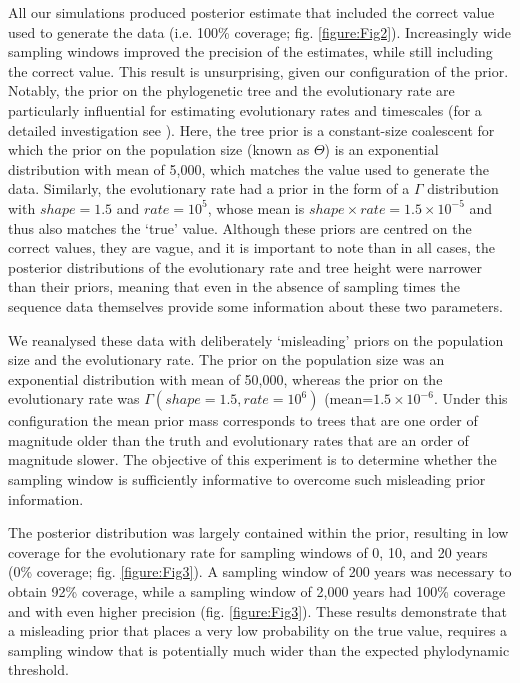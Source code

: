 \documentclass[11pt]{article}
\begin{document}
All our simulations produced posterior estimate that included the correct value used to generate the data (i.e. 100\% coverage; fig. \ref{figure:Fig2}). Increasingly wide sampling windows improved the precision of the estimates, while still including the correct value. This result is unsurprising, given our configuration of the prior. Notably, the prior on the phylogenetic tree and the evolutionary rate are particularly influential for estimating evolutionary rates and timescales (for a detailed investigation see \cite{tay2024assessing}). Here, the tree prior is a constant-size coalescent for which the prior on the population size (known as $\Theta$) is an exponential distribution with mean of 5,000, which matches the value used to generate the data. Similarly, the evolutionary rate had a prior in the form of a $\Gamma$ distribution with $shape=1.5$ and $rate=10^{5}$, whose mean is $shape\times rate=1.5\times10^{-5}$ and thus also matches the `true' value. Although these priors are centred on the correct values, they are vague, and it is important to note than in all cases, the posterior distributions of the evolutionary rate and tree height were narrower than their priors, meaning that even in the absence of sampling times the sequence data themselves provide some information about these two parameters.

We reanalysed these data with deliberately `misleading' priors on the population size and the evolutionary rate. The prior on the population size was an exponential distribution with mean of 50,000, whereas the prior on the evolutionary rate was $\Gamma(shape=1.5, rate=10^{6})$ (mean=$1.5\times10^{-6}$. Under this configuration the mean prior mass corresponds to trees that are one order of magnitude older than the truth and evolutionary rates that are an order of magnitude slower. The objective of this experiment is to determine whether the sampling window is sufficiently informative to overcome such misleading prior information.

The posterior distribution was largely contained within the prior, resulting in low coverage for the evolutionary rate for sampling windows of 0, 10, and 20 years (0\% coverage; fig. \ref{figure:Fig3}). A sampling window of 200 years was necessary to obtain 92\% coverage, while a sampling window of 2,000 years had 100\% coverage and with even higher precision (fig. \ref{figure:Fig3}). These results demonstrate that a misleading prior that places a very low probability on the true value, requires a sampling window that is potentially much wider than the expected phylodynamic threshold. 
\end{document}
